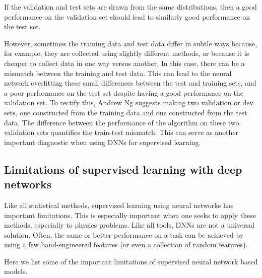 \documentclass[%
oneside,                 %
final,                   %
10pt]{article}
\begin{document}
\noindent
If the validation and test sets are drawn from the same distributions,
then a good performance on the validation set should lead to similarly
good performance on the test set. 

However, sometimes
the training data and test data differ in subtle ways because, for
example, they are collected using slightly different methods, or
because it is cheaper to collect data in one way versus another. In
this case, there can be a mismatch between the training and test
data. This can lead to the neural network overfitting these small
differences between the test and training sets, and a poor performance
on the test set despite having a good performance on the validation
set. To rectify this, Andrew Ng suggests making two validation or dev
sets, one constructed from the training data and one constructed from
the test data. The difference between the performance of the algorithm
on these two validation sets quantifies the train-test mismatch. This
can serve as another important diagnostic when using DNNs for
supervised learning.

\subsection{Limitations of supervised learning with deep networks}

Like all statistical methods, supervised learning using neural
networks has important limitations. This is especially important when
one seeks to apply these methods, especially to physics problems. Like
all tools, DNNs are not a universal solution. Often, the same or
better performance on a task can be achieved by using a few
hand-engineered features (or even a collection of random
features). 

Here we list some of the important limitations of supervised neural network based models. 
\end{document}
